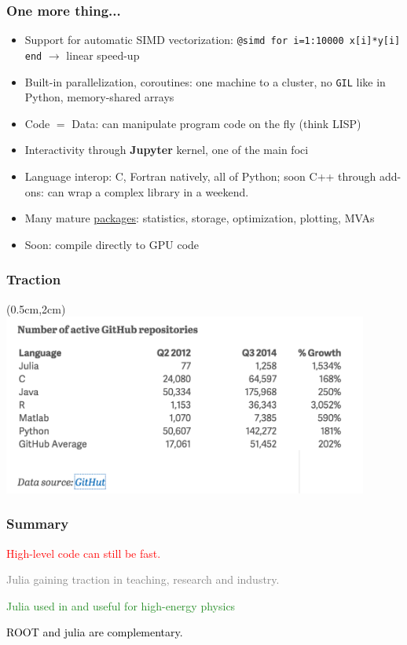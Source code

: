 \documentclass[16pt]{beamer}
\begin{document}
\begin{frame}[fragile]
  \frametitle{One more thing...}
  \begin{itemize}
    \item Support for automatic SIMD vectorization: \texttt{@simd for i=1:10000 x[i]*y[i] end} $\rightarrow$ linear speed-up
    \item Built-in parallelization, coroutines: one machine to a cluster, no \texttt{GIL} like in Python, memory-shared arrays
    \item Code $=$ Data: can manipulate program code on the fly (think LISP)
    \item Interactivity through \textbf{Jupyter} kernel, one of the main foci
    \item Language interop: C, Fortran natively, all of Python; soon C++ through add-ons: can wrap a complex library in a weekend.
    \item Many mature \href{http://pkg.julialang.org/}{packages}: statistics, storage, optimization, plotting, MVAs
    \item Soon: compile directly to GPU code
  \end{itemize}
\end{frame}

\begin{frame}[fragile]
  \frametitle{Traction}
  \begin{textblock*}{5cm}(0.5cm,2cm) %
    \includegraphics[width=12cm]{popularity.png}
  \end{textblock*}
\end{frame}

\begin{frame}
  \frametitle{Summary}
  \begin{center}
  \Large \textcolor{red}{High-level code can still be fast.}
  \end{center}

  \begin{center}
  \Large \textcolor{gray}{Julia gaining traction in teaching, research and industry.}
  \end{center}

  \begin{center}
  \Large \textcolor{ForestGreen}{Julia used in and useful for high-energy physics}
  \end{center}

  \begin{center}
  \Large \textcolor{black}{ROOT and julia are complementary.}
  \end{center}

\end{frame}
\end{document}
